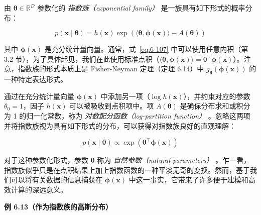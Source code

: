 由 $ \boldsymbol{\theta} \in \mathbb{R}^D $ 参数化的 \emph{指数族（exponential family）} 是一族具有如下形式的概率分布：

\begin{equation}
p(\boldsymbol{x} \mid \boldsymbol{\theta}) = h(\boldsymbol{x}) \exp \left( \langle \boldsymbol{\theta}, \boldsymbol{\phi}(\boldsymbol{x}) \rangle - A(\boldsymbol{\theta}) \right)
\tag{6.107}\label{eq:6-107}
\end{equation}

其中 $ \boldsymbol{\phi}(\boldsymbol{x}) $ 是充分统计量向量。通常，式~\eqref{eq:6-107} 中可以使用任意内积（第 3.2 节），为了具体起见，我们在此使用标准点积（$ \langle \boldsymbol{\theta}, \boldsymbol{\phi}(\boldsymbol{x}) \rangle = \boldsymbol{\theta}^\top \boldsymbol{\phi}(\boldsymbol{x}) $）。注意，指数族的形式本质上是 Fisher-Neyman 定理（定理 6.14）中 $ g_{\boldsymbol{\theta}}(\boldsymbol{\phi}(\boldsymbol{x})) $ 的一种特定表达形式。

通过在充分统计量向量 $ \boldsymbol{\phi}(\boldsymbol{x}) $ 中添加另一项（$ \log h(\boldsymbol{x}) $），并约束对应的参数 $ \theta_0 = 1 $，因子 $ h(\boldsymbol{x}) $ 可以被吸收到点积项中。项 $ A(\boldsymbol{\theta}) $ 是确保分布求和或积分为 1 的归一化常数，称为 \emph{对数配分函数（log-partition function）} 。忽略这两项并将指数族视为具有如下形式的分布，可以获得对指数族良好的直观理解：

\begin{equation}
p(\boldsymbol{x} \mid \boldsymbol{\theta}) \propto \exp \left( \boldsymbol{\theta}^\top \boldsymbol{\phi}(\boldsymbol{x}) \right)
\tag{6.108}\label{eq:6-108}
\end{equation}

对于这种参数化形式，参数 $ \boldsymbol{\theta} $ 称为 \emph{自然参数（natural parameters）} 。乍一看，指数族似乎只是在点积结果上加上指数函数的一种平淡无奇的变换。然而，基于我们可以将有关数据的信息捕获在 $ \boldsymbol{\phi}(\boldsymbol{x}) $ 中这一事实，它带来了许多便于建模和高效计算的深远意义。

\begin{notebox}
\textbf{例 6.13（作为指数族的高斯分布）}
\end{notebox}

